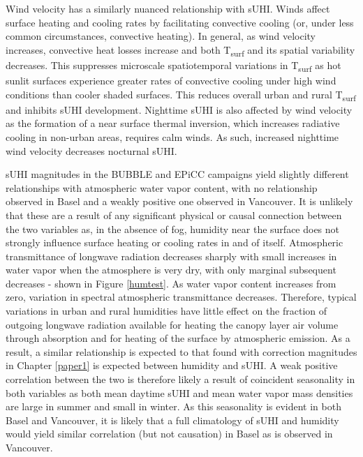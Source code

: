 \begin{bibunit}
Wind velocity has a similarly nuanced relationship with sUHI. Winds affect surface heating and cooling rates by facilitating convective cooling (or, under less common circumstances, convective heating). In general, as wind velocity increases, convective heat losses increase and both T\textsubscript{surf} and its spatial variability decreases. This suppresses microscale spatiotemporal variations in T\textsubscript{surf} as hot sunlit surfaces experience greater rates of convective cooling under high wind conditions than cooler shaded surfaces. This reduces overall urban and rural T\textsubscript{surf} and inhibits sUHI development. Nighttime sUHI is also affected by wind velocity as the formation of a near surface thermal inversion, which increases radiative cooling in non-urban areas, requires calm winds. As such, increased nighttime wind velocity decreases nocturnal sUHI.

sUHI magnitudes in the BUBBLE and EPiCC campaigns yield slightly different relationships with atmospheric water vapor content, with no relationship observed in Basel and a weakly positive one observed in Vancouver. It is unlikely that these are a result of any significant physical or causal connection between the two variables as, in the absence of fog, humidity near the surface does not strongly influence surface heating or cooling rates in and of itself. Atmospheric transmittance of longwave radiation decreases sharply with small increases in water vapor when the atmosphere is very dry, with only marginal subsequent decreases - shown in Figure \ref{humtest}. As water vapor content increases from zero, variation in spectral atmospheric transmittance decreases. Therefore, typical variations in urban and rural humidities have little effect on the fraction of outgoing longwave radiation available for heating the canopy layer air volume through absorption and for heating of the surface by atmospheric emission. As a result, a similar relationship is expected to that found with correction magnitudes in Chapter \ref{paper1} is expected between humidity and sUHI. A weak positive correlation between the two is therefore likely a result of coincident seasonality in both variables as both mean daytime sUHI and mean water vapor mass densities are large in summer and small in winter. As this seasonality is evident in both Basel and Vancouver, it is likely that a full climatology of sUHI and humidity would yield similar correlation (but not causation) in Basel as is observed in Vancouver. 


\end{bibunit}
